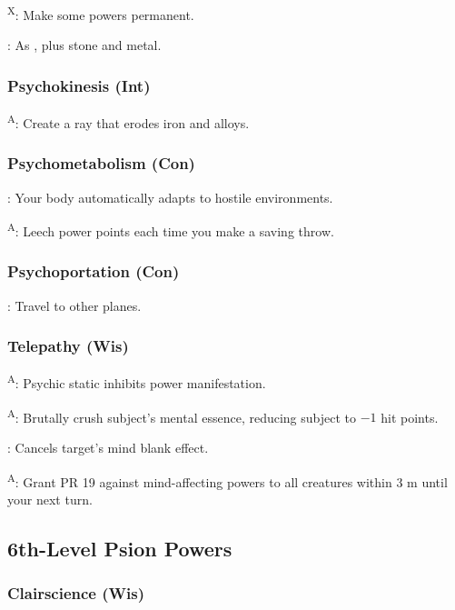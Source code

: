 \textsuperscript{X}: Make some powers permanent.

: As , plus stone and metal.


\subsubsection{Psychokinesis (Int)}

\textsuperscript{A}: Create a ray that erodes iron and alloys.


\subsubsection{Psychometabolism (Con)}

: Your body automatically adapts to hostile environments.

\textsuperscript{A}: Leech power points each time you make a saving throw.


\subsubsection{Psychoportation (Con)}

: Travel to other planes.


\subsubsection{Telepathy (Wis)}

\textsuperscript{A}: Psychic static inhibits power manifestation.

\textsuperscript{A}: Brutally crush subject's mental essence, reducing subject to $-1$ hit points.

: Cancels target's mind blank effect.

\textsuperscript{A}: Grant PR 19 against mind-affecting powers to all creatures within 3 m until your next turn.



\subsection{6th-Level Psion Powers}


\subsubsection{Clairscience (Wis)}

